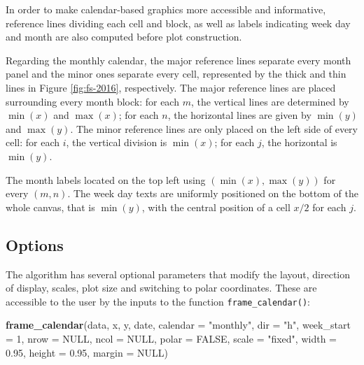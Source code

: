 \documentclass[12pt]{article}
\newenvironment{Shaded}{\begin{snugshade}}{\end{snugshade}}
\newcommand{\DataTypeTok}[1]{\textcolor[rgb]{0.13,0.29,0.53}{#1}}
\newcommand{\DecValTok}[1]{\textcolor[rgb]{0.00,0.00,0.81}{#1}}
\newcommand{\FloatTok}[1]{\textcolor[rgb]{0.00,0.00,0.81}{#1}}
\newcommand{\KeywordTok}[1]{\textcolor[rgb]{0.13,0.29,0.53}{\textbf{#1}}}
\newcommand{\NormalTok}[1]{#1}
\newcommand{\OtherTok}[1]{\textcolor[rgb]{0.56,0.35,0.01}{#1}}
\newcommand{\StringTok}[1]{\textcolor[rgb]{0.31,0.60,0.02}{#1}}
\begin{document}
In order to make calendar-based graphics more accessible and informative, reference lines dividing each cell and block, as well as labels indicating week day and month are also computed before plot construction.

Regarding the monthly calendar, the major reference lines separate every month panel and the minor ones separate every cell, represented by the thick and thin lines in Figure \ref{fig:fs-2016}, respectively. The major reference lines are placed surrounding every month block: for each \(m\), the vertical lines are determined by \(\min{(x)}\) and \(\max{(x)}\); for each \(n\), the horizontal lines are given by \(\min{(y)}\) and \(\max{(y)}\). The minor reference lines are only placed on the left side of every cell: for each \(i\), the vertical division is \(\min{(x)}\); for each \(j\), the horizontal is \(\min{(y)}\).

The month labels located on the top left using \((\min{(x)}, \max{(y)})\) for every \((m, n)\). The week day texts are uniformly positioned on the bottom of the whole canvas, that is \(\min{(y)}\), with the central position of a cell \(x / 2\) for each \(j\).

\hypertarget{sec:opt}{%
\subsection{Options}\label{sec:opt}}

The algorithm has several optional parameters that modify the layout, direction of display, scales, plot size and switching to polar coordinates. These are accessible to the user by the inputs to the function \texttt{frame\_calendar()}:

\begin{Shaded}
\begin{Highlighting}[]
\KeywordTok{frame_calendar}\NormalTok{(data, x, y, date, }\DataTypeTok{calendar =} \StringTok{"monthly"}\NormalTok{, }\DataTypeTok{dir =} \StringTok{"h"}\NormalTok{,}
  \DataTypeTok{week_start =} \DecValTok{1}\NormalTok{, }\DataTypeTok{nrow =} \OtherTok{NULL}\NormalTok{, }\DataTypeTok{ncol =} \OtherTok{NULL}\NormalTok{, }\DataTypeTok{polar =} \OtherTok{FALSE}\NormalTok{, }\DataTypeTok{scale =} \StringTok{"fixed"}\NormalTok{,}
  \DataTypeTok{width =} \FloatTok{0.95}\NormalTok{, }\DataTypeTok{height =} \FloatTok{0.95}\NormalTok{, }\DataTypeTok{margin =} \OtherTok{NULL}\NormalTok{)}
\end{Highlighting}
\end{Shaded}
\end{document}
